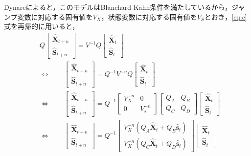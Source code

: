 \documentclass[dvipdfmx]{jlreq}
\begin{document}
Dynareによると，このモデルはBlanchard-Kahn条件を満たしているから，ジャンプ変数に対応する固有値を$V_X$，状態変数に対応する固有値を$V_S$とおき，\eqref{eq:c}式を再帰的に用いると，
\begin{equation} \label{eq:e}
  \begin{split}
    & Q
    \begin{bmatrix}
      \widehat{\boldsymbol{X}}_{t+n} \\
      \widehat{\boldsymbol{S}}_{t+n}
    \end{bmatrix}
    = V^{-1} Q
    \begin{bmatrix}
      \widehat{\boldsymbol{X}}_t \\
      \widehat{\boldsymbol{S}}_t
    \end{bmatrix} \\
    & \Leftrightarrow \qquad
    \begin{bmatrix}
      \widehat{\boldsymbol{X}}_{t+n} \\
      \widehat{\boldsymbol{S}}_{t+n}
    \end{bmatrix}
    = Q^{-1} V^{-n} Q
    \begin{bmatrix}
      \widehat{\boldsymbol{X}}_t \\
      \widehat{\boldsymbol{S}}_t
    \end{bmatrix} \\
    & \Leftrightarrow \qquad
    \begin{bmatrix}
      \widehat{\boldsymbol{X}}_{t+n} \\
      \widehat{\boldsymbol{S}}_{t+n}
    \end{bmatrix}
    = Q^{-1}
    \begin{bmatrix}
      V_X^{-n} & 0 \\
      0 & V_s^{-n}
    \end{bmatrix}
    \begin{bmatrix}
      Q_A & Q_B \\
      Q_C & Q_D
    \end{bmatrix}
    \begin{bmatrix}
      \widehat{\boldsymbol{X}}_t \\
      \widehat{\boldsymbol{S}}_t
    \end{bmatrix} \\
    & \Leftrightarrow \qquad
    \begin{bmatrix}
      \widehat{\boldsymbol{X}}_{t+n} \\
      \widehat{\boldsymbol{S}}_{t+n}
    \end{bmatrix}
    = Q^{-1}
    \begin{bmatrix}
      V_X^{-n} (Q_A \widehat{\boldsymbol{X}}_t + Q_B \widehat{\boldsymbol{s}}_t) \\
      V_X^{-n} (Q_C \widehat{\boldsymbol{X}}_t + Q_D \widehat{\boldsymbol{s}}_t)
    \end{bmatrix}
    \begin{bmatrix}
      \widehat{\boldsymbol{X}}_t \\
      \widehat{\boldsymbol{S}}_t
    \end{bmatrix}
  \end{split}
\end{equation}
\end{document}
